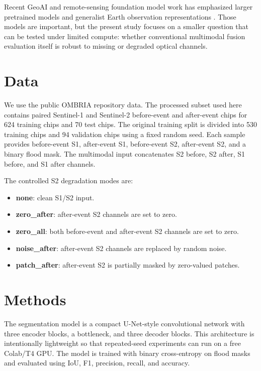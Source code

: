 \documentclass[review]{elsarticle}
\begin{document}
Recent GeoAI and remote-sensing foundation model work has emphasized larger
pretrained models and generalist Earth observation representations
\cite{jakubik2023foundation,huang2025survey,marsocci2025terratorch}. Those
models are important, but the present study focuses on a smaller question that
can be tested under limited compute: whether conventional multimodal fusion
evaluation itself is robust to missing or degraded optical channels.

\section{Data}

We use the public OMBRIA repository data. The processed subset used here
contains paired Sentinel-1 and Sentinel-2 before-event and after-event chips for
624 training chips and 70 test chips. The original training split is divided
into 530 training chips and 94 validation chips using a fixed random seed. Each
sample provides before-event S1, after-event S1, before-event S2, after-event
S2, and a binary flood mask. The multimodal input concatenates S2 before, S2
after, S1 before, and S1 after channels.

The controlled S2 degradation modes are:

\begin{itemize}
  \item \textbf{none}: clean S1/S2 input.
  \item \textbf{zero\_after}: after-event S2 channels are set to zero.
  \item \textbf{zero\_all}: both before-event and after-event S2 channels are
  set to zero.
  \item \textbf{noise\_after}: after-event S2 channels are replaced by random
  noise.
  \item \textbf{patch\_after}: after-event S2 is partially masked by zero-valued
  patches.
\end{itemize}

\section{Methods}

The segmentation model is a compact U-Net-style convolutional network with
three encoder blocks, a bottleneck, and three decoder blocks. This architecture
is intentionally lightweight so that repeated-seed experiments can run on a
free Colab/T4 GPU. The model is trained with binary cross-entropy on flood masks
and evaluated using IoU, F1, precision, recall, and accuracy.
\end{document}
